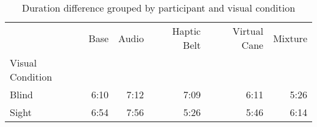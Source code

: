 
\begin{table}[!htb]
\centering
\caption{Duration difference grouped by participant and visual condition}
\label{tab:duracao_min_average_group}
\begin{tabular}{lrrrrr}
\toprule
{} &  Base & Audio & Haptic Belt & Virtual Cane & Mixture \\
Visual Condition &       &       &             &              &         \\
\midrule
Blind            &  6:10 &  7:12 &        7:09 &         6:11 &    5:26 \\
Sight            &  6:54 &  7:56 &        5:26 &         5:46 &    6:14 \\
\bottomrule
\end{tabular}
\end{table}

